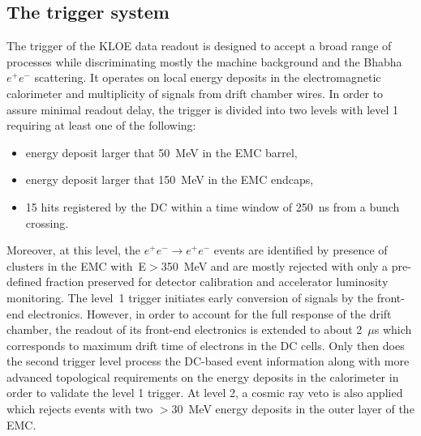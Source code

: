 \subsection{The trigger system}\label{sec:trigger}
The trigger of the KLOE data readout is designed to accept a broad range of processes while discriminating mostly the machine background and the Bhabha $e^+e^-$ scattering. It operates on local energy deposits in the electromagnetic calorimeter and multiplicity of signals from drift chamber wires. In order to assure minimal readout delay, the trigger is divided into two levels with level 1 requiring at least one of the following:
\begin{itemize}
\item energy deposit larger that 50~MeV in the EMC barrel,
\item energy deposit larger that 150~MeV in the EMC endcaps,
\item 15 hits registered by the DC within a time window of 250~ns from a bunch crossing.
\end{itemize}
Moreover, at this level, the $e^+e^-\to e^+e^-$ events are identified by presence of clusters in the EMC with~E$>$350~MeV and are mostly rejected with only a pre-defined fraction preserved for detector calibration and accelerator luminosity monitoring. The level~1 trigger initiates early conversion of signals by the front-end electronics. However, in order to account for the full response of the drift chamber, the readout of its front-end electronics is extended to about 2~$\mu$s which corresponds to maximum drift time of electrons in the DC cells. Only then does the second trigger level process the DC-based event information along with more advanced topological requirements on the energy deposits in the calorimeter in order to validate the level 1 trigger. At level 2, a cosmic ray veto is also applied which rejects events with two $>$30~MeV energy deposits in the outer layer of the EMC\@.

